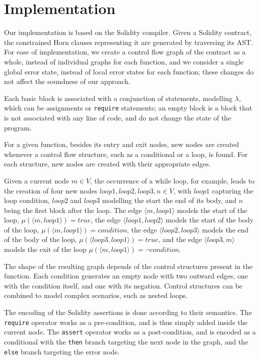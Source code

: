 \section{Implementation}

Our implementation is based on the Solidity compiler. Given a Solidity contract, the constrained Horn clauses representing it are generated by traversing its AST. For ease of implementation, we create a control flow graph of the contract as a whole, instead of individual graphs for each function, and we consider a single global error state, instead of local error states for each function; these changes do not affect the soundness of our approach.

Each basic block is associated with a conjunction of statements, modelling $\lambda$, which can be assignments or \texttt{require} statements; an empty block is a block that is not associated with any line of code, and do not change the state of the program. 

For a given function, besides its entry and exit nodes, new nodes are created whenever a control flow structure, such as a conditional or a loop, is found. For each structure, new nodes are created with their appropriate edges.

Given a current node $m \in V$, the occurrence of a while loop, for example, leads to the creation of four new nodes $loop1, loop2, loop3, n \in V$, with $loop1$ capturing the loop condition, $loop2$ and $loop3$ modelling the start the end of its body, and $n$ being the first block after the loop. The edge $\langle m, loop1 \rangle$ models the start of the loop, $\mu(\langle m, loop1 \rangle) = true$, the edge $\langle loop1, loop2 \rangle$ models the start of the body of the loop, $\mu(\langle m, loop1 \rangle) = condition$, the edge $\langle loop2, loop3 \rangle$ models the end of the body of the loop, $\mu(\langle loop3, loop1 \rangle) = true$, and the edge $\langle loop3, m \rangle$ models the exit of the loop $\mu(\langle m, loop1 \rangle) = \neg condition$.

The shape of the resulting graph depends of the control structures present in the function. Each condition generates an empty node with two outward edges, one with the condition itself, and one with its negation. Control structures can be combined to model complex scenarios, such as nested loops.

The encoding of the Solidity assertions is done according to their semantics. The \texttt{require} operator works as a pre-condition, and is thus simply added inside the current node. The \texttt{assert} operator works as a post-condition, and is encoded as a conditional with the \texttt{then} branch targeting the next node in the graph, and the \texttt{else} branch targeting the error node.

